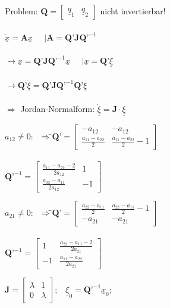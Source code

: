 \documentclass[a4paper,twocolumn,10pt]{article}
\begin{document}
Problem: $\textbf{Q}=\begin{bmatrix}\underline{q}_1 & \underline{q}_2\end{bmatrix}$ nicht invertierbar!\\\\
$\underline{\dot{x}}=\textbf{A}\underline{x}\;\;\;\;\;|\textbf{A}=\textbf{Q'}\textbf{J}\textbf{Q'}^{-1}$\\\\
$\rightarrow\underline{\dot{x}}=\textbf{Q'}\textbf{J}\textbf{Q'}^{-1}\underline{x}\;\;\;\;\;|\underline{x}=\textbf{Q'}\underline{\xi}$\\\\
$\rightarrow\textbf{Q'}\underline{\dot\xi}=\textbf{Q'}\textbf{J}\textbf{Q'}^{-1}\textbf{Q'}\underline{\xi}$\\\\
$\Rightarrow$ Jordan-Normalform: $\dot{\underline{\xi}} =\textbf{J}\cdot \underline{\xi}$
\begin{tabbing}
$a_{12}\neq 0:\;\;\Rightarrow$\=$\textbf{Q'}=\begin{bmatrix}-a_{12} & -a_{12}\\ \frac{a_{11}-a_{22}}{2} & \frac{a_{11}-a_{22}}{2}-1\end{bmatrix}$\\\\
\>$\textbf{Q'}^{-1}=\begin{bmatrix}\frac{a_{11}-a_{22}-2}{2a_{12}} & 1 \\ \frac{a_{22}-a_{11}}{2a_{12}} & -1\end{bmatrix}$
\end{tabbing}
\begin{tabbing}
$a_{21}\neq 0:\;\;\Rightarrow$\=$\textbf{Q'}=\begin{bmatrix}\frac{a_{22}-a_{11}}{2} & \frac{a_{22}-a_{11}}{2}-1 \\ -a_{21} & -a_{21}\end{bmatrix}$\\\\
\>$\textbf{Q'}^{-1}=\begin{bmatrix}1 & \frac{a_{22}-a_{11}-2}{2a_{21}} \\ -1 & \frac{a_{11}-a_{22}}{2a_{21}} \end{bmatrix}$
\end{tabbing}
$\textbf{J}=\begin{bmatrix}\lambda & 1 \\ 0 & \lambda\end{bmatrix};\;\;\;\underline{\xi}_0=\textbf{Q'}^{-1}\underline{x}_0;\;\;\;$\\\\
\end{document}
